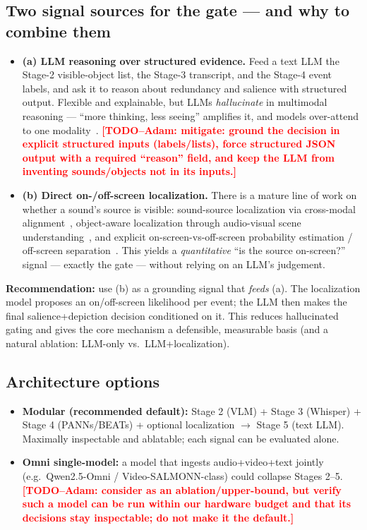 \documentclass[11pt,a4paper]{article}
\newcommand{\TODO}[1]{\textcolor{red}{\textbf{[TODO--Adam: #1]}}}
\begin{document}
\subsection{Two signal sources for the gate --- and why to combine them}
\begin{itemize}
  \item \textbf{(a) LLM reasoning over structured evidence.} Feed a text LLM the Stage-2 visible-object
    list, the Stage-3 transcript, and the Stage-4 event labels, and ask it to reason about redundancy
    and salience with structured output. Flexible and explainable, but LLMs \emph{hallucinate} in
    multimodal reasoning --- ``more thinking, less seeing'' amplifies it, and models over-attend to
    one modality~\cite{forkmerge, avattn}. \TODO{mitigate: ground the decision in explicit
    structured inputs (labels/lists), force structured JSON output with a required ``reason'' field,
    and keep the LLM from inventing sounds/objects not in its inputs.}
  \item \textbf{(b) Direct on-/off-screen localization.} There is a mature line of work on whether a
    sound's source is visible: sound-source localization via cross-modal
    alignment~\cite{ssloc}, object-aware localization through audio-visual scene
    understanding~\cite{objaware}, and explicit on-screen-vs-off-screen probability estimation /
    off-screen separation~\cite{offscreensep}. This yields a \emph{quantitative} ``is the source
    on-screen?'' signal --- exactly the gate --- without relying on an LLM's judgement.
\end{itemize}
\textbf{Recommendation:} use (b) as a grounding signal that \emph{feeds} (a). The localization model
proposes an on/off-screen likelihood per event; the LLM then makes the final salience+depiction
decision conditioned on it. This reduces hallucinated gating and gives the core mechanism a
defensible, measurable basis (and a natural ablation: LLM-only vs.\ LLM+localization).

\subsection{Architecture options}
\begin{itemize}
  \item \textbf{Modular (recommended default):} Stage 2 (VLM) + Stage 3 (Whisper) + Stage 4
    (PANNs/BEATs) + optional localization $\rightarrow$ Stage 5 (text LLM). Maximally inspectable and
    ablatable; each signal can be evaluated alone.
  \item \textbf{Omni single-model:} a model that ingests audio+video+text jointly (e.g.\ Qwen2.5-Omni /
    Video-SALMONN-class) could collapse Stages 2--5. \TODO{consider as an ablation/upper-bound, but
    verify such a model can be run within our hardware budget and that its decisions stay
    inspectable; do not make it the default.}
\end{itemize}
\end{document}
